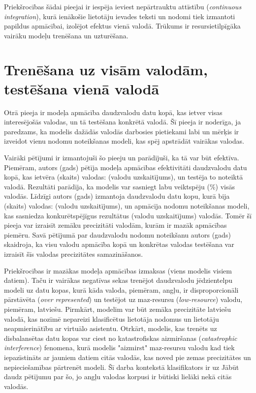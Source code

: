 Priekšrocības šādai pieejai ir iespēja ieviest nepārtrauktu attīstību (\textit{continuous integration}), kurā ienākošie lietotāju ievades teksti un nodomi tiek izmantoti papildus apmācībai, izolējot efektus vienā valodā. Trūkums ir resursietilpīgāka vairāku modeļu trenēšana un uzturēšana.

\section{Trenēšana uz visām valodām, testēšana vienā valodā}

Otrā pieeja ir modeļa apmācība daudzvalodu datu kopā, kas ietver visas interesējošās valodas, un tā testēšana konkrētā valodā. Šī pieeja ir noderīga, ja paredzams, ka modelis dažādās valodās darbosies pietiekami labi un mērķis ir izveidot vienu nodomu noteikšanas modeli, kas spēj apstrādāt vairākas valodas. 

Vairāki pētījumi ir izmantojuši šo pieeju un parādījuši, ka tā var būt efektīva. Piemēram, autors (gads) pētīja modeļa apmācības efektivitāti daudzvalodu datu kopā, kas ietvēra (skaits) valodas: (valodu uzskaitījums), un testēja to noteiktā valodā. Rezultāti parādīja, ka modelis var sasniegt labu veiktspēju (\%) visās valodās. Līdzīgi autors (gads) izmantoja daudzvalodu datu kopu, kurā bija (skaits) valodas: (valodu uzskaitījums), un apmācīja nodomu noteikšanas modeli, kas sasniedza konkurētspējīgus rezultātus (valodu uzskaitījums) valodās. Tomēr šī pieeja var izraisīt zemāku precizitāti valodām, kurām ir mazāk apmācības piemēru. Savā pētījumā par daudzvalodu nodomu noteikšanu autors (gads) skaidroja, ka visu valodu apmācība kopā un konkrētas valodas testēšana var izraisīt šīs valodas precizitātes samazināšanos.

Priekšrocības ir mazākas modeļa apmācības izmaksas (viens modelis visiem datiem). Taču ir vairākas negatīvas sekas trenējot daudzvalodu jēdzientelpu modeli uz datu kopas, kurā kāda valoda, piemēram, angļu, ir disproporcionāli pārstāvēta (\textit{over represented}) un testējot uz maz-resursu (\textit{low-resource}) valodu, piemēram, latviešu. Pirmkārt, modelim var būt zemāka precizitāte latviešu valodā, kas nozīmē nepareizi klasificētus lietotāja nodomus un lietotāju neapmierinātību ar virtuālo asistentu. Otrkārt, modelis, kas trenēts uz disbalansētas datu kopas var ciest no katastrofiskas aizmiršanas (\textit{catastrophic interference}) fenomena, kurā modelis "aizmirst" maz-resursu valodu kad tiek iepazīstināts ar jauniem datiem citās valodās, kas noved pie zemas precizitātes un nepieciešamības pārtrenēt modeli. Šī darba kontekstā klasifikators ir uz 
Jābūt daudz pētījumu par šo, jo angļu valodas korpusi ir būtiski lielāki nekā citās valodās.


